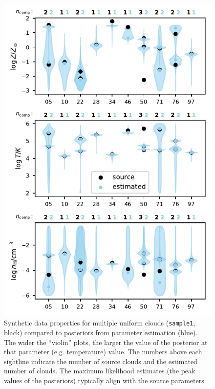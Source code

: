 \documentclass[fleqn,usenatbib]{mnras}
\begin{document}
\begin{figure}
    \centering
    \includegraphics[width=\columnwidth]{figures/sample1/comparison.pdf}
    \caption{
    Synthetic data properties for multiple uniform clouds (\texttt{sample1}, black) compared to posteriors from parameter estimation (blue).
    The wider the ``violin'' plots, the larger the value of the posterior at that parameter (e.g. temperature) value.
    The numbers above each sightline indicate the number of source clouds and the estimated number of clouds.
    The maximum likelihood estimates (the peak values of the posteriors) typically align with the source parameters.
    }
    \label{f: sample1 violin}
\end{figure}
\end{document}
